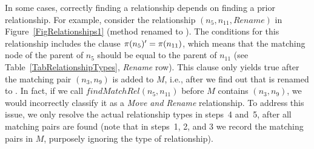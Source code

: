 In some cases, correctly finding a relationship depends on finding a prior relationship.
For example, consider the relationship $(n_5, n_{11}, Rename)$ in Figure~\ref{FigRelationships1} (method  renamed to ).
The conditions for this relationship includes the clause $\operatorname{\pi}(n_5)' = \operatorname{\pi}(n_{11})$, which means that the matching node of the parent of $n_5$ should be equal to the parent of $n_{11}$ (see Table~\ref{TabRelationshipTypes}, \textit{Rename} row).
This clause only yields true after the matching pair $(n_3, n_9)$ is added to $M$, i.e., after we find out that  is renamed to .
In fact, if we call $\mathit{findMatchRel}(n_5, n_{11})$ before $M$ contains $(n_3, n_9)$, we would incorrectly classify it as a \textit{Move and Rename} relationship.
To address this issue, we only resolve the actual relationship types in steps~4 and~5, after all matching pairs are found (note that in steps~1, 2, and 3 we record the matching pairs in $M$, purposely ignoring the type of relationship).


